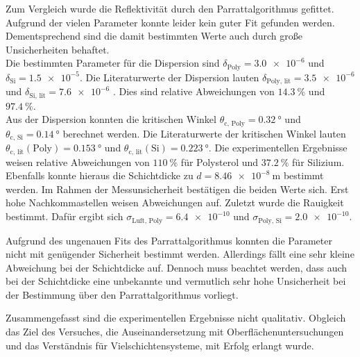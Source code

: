 Zum Vergleich wurde die Reflektivität durch den Parrattalgorithmus gefittet. Aufgrund der vielen Parameter konnte leider kein guter Fit gefunden werden. Dementsprechend 
sind die damit bestimmten Werte auch durch große Unsicherheiten behaftet. \\
Die bestimmten Parameter für die Dispersion sind $\delta_\text{Poly} = \num{3.0e-6}$ und 
$\delta_\text{Si} = \num{1.5e-5}$. Die Literaturwerte der Dispersion lauten $\delta_\text{Poly, lit} = \num{3.5e-6}$ und $\delta_\text{Si, lit} = \num{7.6e-6}$ \cite{V44}.
Dies sind relative Abweichungen von $\qty{14.3}{\percent}$ und $\qty{97.4}{\percent}$. \\
Aus der Dispersion konnten die kritischen Winkel 
$\theta_\text{c, Poly} = \qty{0.32}{\degree}$ und $\theta_\text{c, Si} = \qty{0.14}{\degree}$ berechnet werden. Die Literaturwerte der kritischen Winkel lauten 
$\theta_\text{c, lit}(\text{Poly}) =\qty{0.153}{\degree}$ und $\theta_\text{c, lit}(\text{Si}) =\qty{0.223}{\degree}$. Die experimentellen Ergebnisse weisen relative 
Abweichungen von $\qty{110}{\percent}$ für Polysterol und $\qty{37.2}{\percent}$ für Silizium. \\
Ebenfalls konnte hieraus die Schichtdicke zu $d = \qty{8.46e-8}{\metre}$
bestimmt werden. Im Rahmen der Messunsicherheit bestätigen die beiden Werte sich. Erst hohe Nachkommastellen weisen Abweichungen auf.
Zuletzt wurde die Rauigkeit bestimmt. Dafür ergibt sich $\sigma_\text{Luft, Poly} = \num{6.4e-10}$ und $\sigma_\text{Poly, Si} = \num{2.0e-10}$.

Aufgrund des ungenauen Fits des Parrattalgorithmus konnten die Parameter nicht mit genügender Sicherheit bestimmt werden. Allerdings fällt eine sehr kleine Abweichung 
bei der Schichtdicke auf. Dennoch muss beachtet werden, dass auch bei der Schichtdicke eine unbekannte und vermutlich sehr hohe Unsicherheit bei der Bestimmung über 
den Parrattalgorithmus vorliegt. 

Zusammengefasst sind die experimentellen Ergebnisse nicht qualitativ. Obgleich das Ziel des Versuches, die Auseinandersetzung mit Oberflächenuntersuchungen und das Verständnis 
für Vielschichtensysteme, mit Erfolg erlangt wurde. 